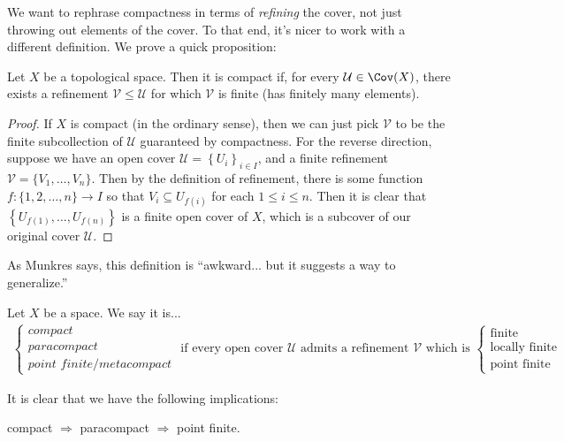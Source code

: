 \documentclass[11pt]{book}
\begin{document}
We want to rephrase compactness in terms of \emph{refining} the cover, not just throwing out elements of the cover. To that end, it's nicer to work with a different definition. We prove a quick proposition:

\begin{proposition}\label{prop:new-def-of-compactness} Let $X$ be a topological space. Then it is compact if, for every $\mathcal{U}\in \Cov(X)$, there exists a refinement $\mathcal{V} \le \mathcal{U}$ for which $\mathcal{V}$ is finite (has finitely many elements).
\end{proposition}
\begin{proof} If $X$ is compact (in the ordinary sense), then we can just pick $\mathcal{V}$ to be the finite subcollection of $\mathcal{U}$ guaranteed by compactness. For the reverse direction, suppose we have an open cover $\mathcal{U} = \left\{ U_i \right\}_{i\in I}$, and a finite refinement $\mathcal{V} =\{V_1, \ldots, V_n\}$. Then by the definition of refinement, there is some function $f \colon \{1,2, \ldots, n\} \to I$ so that $V_i \subseteq U_{f(i)}$ for each $1\le i\le n$. Then it is clear that $\left\{ U_{f(1)}, \ldots, U_{f(n)} \right\}$ is a finite open cover of $X$, which is a subcover of our original cover $\mathcal{U}$.
\end{proof}

As Munkres says, this definition is ``awkward... but it suggests a way to generalize.''

\begin{definition}\label{def:compact-paracompact-point-finite} Let $X$ be a space. We say it is...
\begin{align*}
    \begin{cases} \textit{compact} \\ \textit{paracompact} \\ \textit{point finite/metacompact}\end{cases}\text{ if every open cover }\mathcal{U}\text{ admits a refinement }\mathcal{V}\text{ which is }
    \begin{cases} \text{finite} \\ \text{locally finite} \\ \text{point finite}\end{cases}
\end{align*}
\end{definition}
It is clear that we have the following implications:
\begin{center}
    compact $\Rightarrow$ paracompact $\Rightarrow$ point finite.
\end{center}
\end{document}
